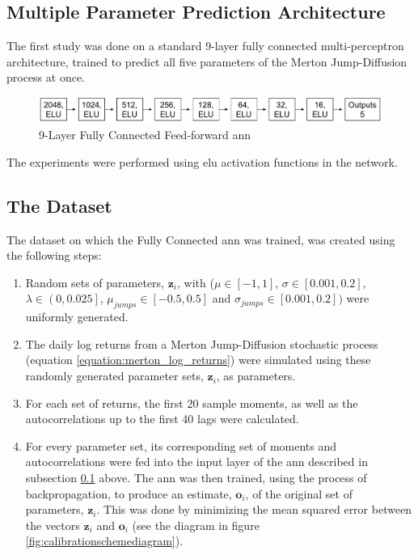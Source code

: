 \documentclass[11pt,oneside,openany,a4paper,english, report, goldenblock
]{usthesis}
\begin{document}
\subsection{Multiple Parameter Prediction Architecture} \label{subsection:fully_connected_ff_nn:architecture}
The first study was done on a standard 9-layer fully connected multi-perceptron architecture, trained to predict all five parameters of the Merton Jump-Diffusion process at once.

\begin{figure}[h]
	\centering
	\includegraphics[width=1\linewidth]{Images/Diagrams/Network-Structures/MultipleOutputFullyConnectedANN}
	\caption[Multiple Output Prediction \acrshort{ann}]{9-Layer Fully Connected Feed-forward \acrshort{ann}}
	\label{fig:multipleoutputcnn}
\end{figure}

The experiments were performed using \acrshort{elu} activation functions in the network. 

\subsection{The Dataset}

The dataset on which the Fully Connected \acrshort{ann} was trained, was created using the following steps:
\begin{enumerate}[1)]
	\itemsep0em 
	\item  Random sets of parameters, $\mathbf{z}_i$, with ($\mu \in \left[-1, 1\right]$, $\sigma \in \left[0.001, 0.2\right]$, $\lambda \in \left(0, 0.025\right]$, $\mu_{jumps} \in \left[-0.5, 0.5\right]$ and $\sigma_{jumps} \in \left[0.001, 0.2\right])$ were uniformly generated.
	\item  The daily log returns from a Merton Jump-Diffusion stochastic process (equation \ref{equation:merton_log_returns}) were simulated using these randomly generated parameter sets, $\mathbf{z}_i$, as parameters.
	\item  For each set of returns, the first 20 sample moments, as well as the autocorrelations up to the first 40 lags were calculated.
	\item For every parameter set, its corresponding set of moments and autocorrelations were fed into the input layer of the \acrshort{ann} described in subsection \ref{subsection:fully_connected_ff_nn:architecture} above. The \acrshort{ann} was then trained, using the process of backpropagation, to produce an estimate, $\mathbf{o}_i$, of the original set of parameters, $\mathbf{z}_i$. This was done by minimizing the mean squared error between the vectors $\mathbf{z}_i$ and $\mathbf{o}_i$ (see the diagram in figure \ref{fig:calibrationschemediagram}).
\end{enumerate}
\end{document}
